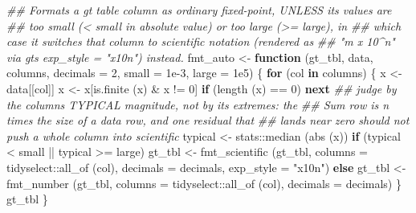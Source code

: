 \documentclass[
  letterpaper,
  DIV=11,
  numbers=noendperiod]{scrreprt}
\newenvironment{Shaded}{\begin{snugshade}}{\end{snugshade}}
\newcommand{\AttributeTok}[1]{\textcolor[rgb]{0.40,0.45,0.13}{#1}}
\newcommand{\ControlFlowTok}[1]{\textcolor[rgb]{0.00,0.23,0.31}{\textbf{#1}}}
\newcommand{\DecValTok}[1]{\textcolor[rgb]{0.68,0.00,0.00}{#1}}
\newcommand{\DocumentationTok}[1]{\textcolor[rgb]{0.37,0.37,0.37}{\textit{#1}}}
\newcommand{\FloatTok}[1]{\textcolor[rgb]{0.68,0.00,0.00}{#1}}
\newcommand{\FunctionTok}[1]{\textcolor[rgb]{0.28,0.35,0.67}{#1}}
\newcommand{\NormalTok}[1]{\textcolor[rgb]{0.00,0.23,0.31}{#1}}
\newcommand{\OtherTok}[1]{\textcolor[rgb]{0.00,0.23,0.31}{#1}}
\newcommand{\SpecialCharTok}[1]{\textcolor[rgb]{0.37,0.37,0.37}{#1}}
\newcommand{\StringTok}[1]{\textcolor[rgb]{0.13,0.47,0.30}{#1}}
\renewcommand{\[}{\begin{equation}}
\renewcommand{\]}{\end{equation}}
\begin{document}
\begin{Shaded}
\begin{Highlighting}[]
\DocumentationTok{\#\# Formats a gt table column as ordinary fixed{-}point, UNLESS its values are}
\DocumentationTok{\#\# too small (\textless{} \textasciigrave{}small\textasciigrave{} in absolute value) or too large (\textgreater{}= \textasciigrave{}large\textasciigrave{}), in}
\DocumentationTok{\#\# which case it switches that column to scientific notation (rendered as}
\DocumentationTok{\#\# "m x 10\^{}n" via gt\textquotesingle{}s exp\_style = "x10n") instead.}
\NormalTok{fmt\_auto }\OtherTok{\textless{}{-}} \ControlFlowTok{function}\NormalTok{ (gt\_tbl, data, columns, }\AttributeTok{decimals =} \DecValTok{2}\NormalTok{, }\AttributeTok{small =} \FloatTok{1e{-}3}\NormalTok{, }\AttributeTok{large =} \FloatTok{1e5}\NormalTok{)}
\NormalTok{\{}
    \ControlFlowTok{for}\NormalTok{ (col }\ControlFlowTok{in}\NormalTok{ columns)}
\NormalTok{    \{}
\NormalTok{        x }\OtherTok{\textless{}{-}}\NormalTok{ data[[col]]}
\NormalTok{        x }\OtherTok{\textless{}{-}}\NormalTok{ x[}\FunctionTok{is.finite}\NormalTok{ (x) }\SpecialCharTok{\&}\NormalTok{ x }\SpecialCharTok{!=} \DecValTok{0}\NormalTok{]}
        \ControlFlowTok{if}\NormalTok{ (}\FunctionTok{length}\NormalTok{ (x) }\SpecialCharTok{==} \DecValTok{0}\NormalTok{) }\ControlFlowTok{next}
        \DocumentationTok{\#\# judge by the column\textquotesingle{}s TYPICAL magnitude, not by its extremes: the}
        \DocumentationTok{\#\# Sum row is n times the size of a data row, and one residual that}
        \DocumentationTok{\#\# lands near zero should not push a whole column into scientific}
\NormalTok{        typical }\OtherTok{\textless{}{-}}\NormalTok{ stats}\SpecialCharTok{::}\FunctionTok{median}\NormalTok{ (}\FunctionTok{abs}\NormalTok{ (x))}
        \ControlFlowTok{if}\NormalTok{ (typical }\SpecialCharTok{\textless{}}\NormalTok{ small }\SpecialCharTok{||}\NormalTok{ typical }\SpecialCharTok{\textgreater{}=}\NormalTok{ large)}
\NormalTok{            gt\_tbl }\OtherTok{\textless{}{-}} \FunctionTok{fmt\_scientific}\NormalTok{ (gt\_tbl, }\AttributeTok{columns =}\NormalTok{ tidyselect}\SpecialCharTok{::}\FunctionTok{all\_of}\NormalTok{ (col), }\AttributeTok{decimals =}\NormalTok{ decimals, }\AttributeTok{exp\_style =} \StringTok{"x10n"}\NormalTok{)}
        \ControlFlowTok{else}
\NormalTok{            gt\_tbl }\OtherTok{\textless{}{-}} \FunctionTok{fmt\_number}\NormalTok{ (gt\_tbl, }\AttributeTok{columns =}\NormalTok{ tidyselect}\SpecialCharTok{::}\FunctionTok{all\_of}\NormalTok{ (col), }\AttributeTok{decimals =}\NormalTok{ decimals)}
\NormalTok{    \}}
\NormalTok{    gt\_tbl}
\NormalTok{\}}


\end{Highlighting}
\end{Shaded}
\end{document}
